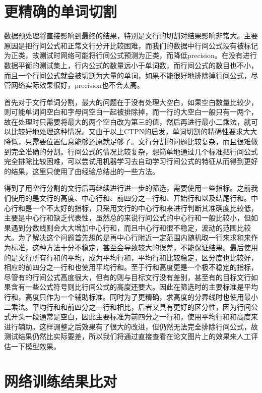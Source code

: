 \section{更精确的单词切割}

数据预处理将直接影响到最终的结果，特别是文行的切割对结果影响非常大。主要原因是把行间公式和正常文行分开比较困难，而我们的数据中行间公式没有被标记为正类，故测试时网络可能将行间公式预测为正类，而降低precision。在没有进行数据平衡的测试集上，行内公式的数量远小于单词数，而行间公式的数目也不小，而且一个行间公式就会被切割为大量的单词，如果不能很好地排除掉行间公式，尽管网络实际效果很好，precision也不会太高。

首先对于文行单词分割，最大的问题在于没有处理大空白，如果空白数量比较少，则可能单词间空白和字母间空白一起被排除掉，而一行的大空白一般只有一两个，故在处理时只需要将最大的两个空白改为第三的值，然后再进行最小二乘法，就可以比较好地处理这种情况。又由于以上CTPN的启发，单词切割的精确性要求大大降低，只需要位置信息能够还原就足够了。文行分割的问题比较复杂，而且很难做到完全准确的分割。行间公式的情况比较复杂，想简单地通过几个标准把行间公式完全排除比较困难，可以尝试用机器学习去自动学习行间公式的特征从而得到更好的结果，这里只使用了由经验总结出的一些方法。

得到了用空行分割的文行后再继续进行进一步的筛选，需要使用一些指标。之前我们使用的是文行的高度、中心行和、前四分之一行和、开始行和以及结尾行和。中心行和是一个不太好的指标，只采用文行的中心行和来进行判断其准确度比较低，主要是中心行和缺乏代表性，虽然总的来说行间公式的中心行和一般比较小，但如果遇到分数线则会大大增加中心行和，而且中心行和很不稳定，波动的范围比较大。为了解决这个问题首先想的是再中心行附近一定范围内随机取一行来求和来作为标准，这种方法十分不稳定，甚至会导致较大的误差，不能保证结果。最后使用的是文行所有行和的平均，成为平均行和，平均行和比较稳定，区分度也比较好，相应的前四分之一行和也使用平均行和。至于行和高度更是一个极不稳定的指标，尽管有的行间公式高度很大，但有的则与目标文行没有差别，甚至有的目标文行如果含有一些公式符号则比行间公式的高度还要大。因此在筛选时的主要标准是平均行和，高度只作为一个辅助标准。同时为了更精确，求高度的分界线时也使用最小二乘法。平均行和和前四分之一行和相比，后者又具有更好的区分性，因为行间公式开头一段通常是空白，因此主要标准为前四分之一行和，使用平均行和和高度来进行辅助。这样调整之后效果有了很大的改进，但仍然无法完全排除行间公式，故测试结果仍然比实际要差，所以我们将通过直接查看在论文图片上的效果来人工评估一下模型效果。

\section{网络训练结果比对}
\noindent


